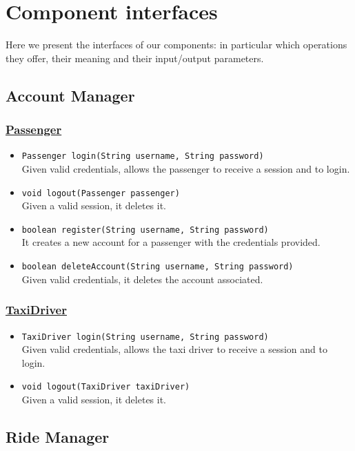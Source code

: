 \section{Component interfaces}\label{componentInterfaces}
Here we present the interfaces of our components: in particular which operations they offer, their meaning and their input/output parameters.
\subsection{Account Manager}
\subsubsection{\underline{Passenger}}
\begin{itemize}
	\item \texttt{Passenger login(String username, String password)}\\
	Given valid credentials, allows the passenger to receive a session and to login.
	\item \texttt{void logout(Passenger passenger)}\\
	Given a valid session, it deletes it.
	\item \texttt{boolean register(String username, String password)}\\
	It creates a new account for a passenger with the credentials provided.
	\item \texttt{boolean deleteAccount(String username, String password)}\\
	Given valid credentials, it deletes the account associated.
\end{itemize}
\subsubsection{\underline{TaxiDriver}}
\begin{itemize}
	\item \texttt{TaxiDriver login(String username, String password)}\\
	Given valid credentials, allows the taxi driver to receive a session and to login.
	\item \texttt{void logout(TaxiDriver taxiDriver)}\\
	Given a valid session, it deletes it.
\end{itemize}
\subsection{Ride Manager}

